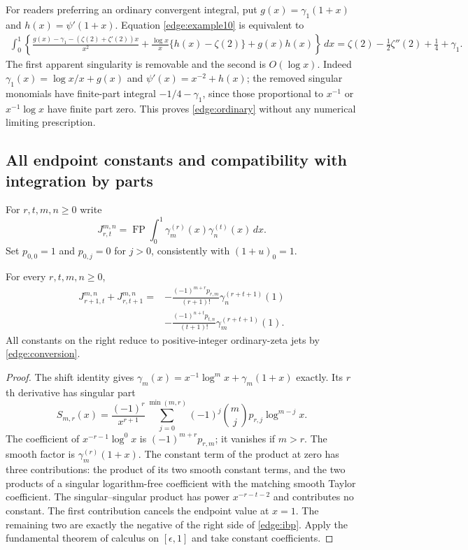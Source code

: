 For readers preferring an ordinary convergent integral, put
$g(x)=\gamma_1(1+x)$ and $h(x)=\psi'(1+x)$.
Equation \eqref{edge:example10} is equivalent to
\begin{equation}
 \begin{split}
 \int_0^1\left\{
   \frac{g(x)-\gamma_1-(\zeta(2)+\zeta'(2))x}{x^2}
  +\frac{\log x}{x}\{h(x)-\zeta(2)\}+g(x)h(x)
                  \right\}\,dx
 =\zeta(2)-\frac12\zeta''(2)+\frac14+\gamma_1.
 \end{split}
 \label{edge:ordinary}
\end{equation}
The first apparent singularity is removable and the second is
$O(\log x)$.  Indeed
$\gamma_1(x)=\log x/x+g(x)$ and $\psi'(x)=x^{-2}+h(x)$;
the removed singular monomials have finite-part integral
$-1/4-\gamma_1$, since those proportional to $x^{-1}$ or
$x^{-1}\log x$ have finite part zero.  This proves
\eqref{edge:ordinary} without any numerical limiting prescription.

\subsection{All endpoint constants and compatibility with integration by parts}

For $r,t,m,n\ge0$ write
\[
 J_{r,t}^{m,n}=\operatorname{FP}\int_0^1
                         \gamma_m^{(r)}(x)\gamma_n^{(t)}(x)\,dx.
\]
Set $p_{0,0}=1$ and $p_{0,j}=0$ for $j>0$, consistently with
$(1+u)_0=1$.

\begin{theorem}
\label{edge:endpoint}
For every $r,t,m,n\ge0$,
\begin{equation}
 \boxed{\begin{aligned}
 J_{r+1,t}^{m,n}+J_{r,t+1}^{m,n}
 ={}&-\frac{(-1)^{m+r}p_{r,m}}{(r+1)!}
                       \gamma_n^{(r+t+1)}(1)\\
    &-\frac{(-1)^{n+t}p_{t,n}}{(t+1)!}
                       \gamma_m^{(r+t+1)}(1).
 \end{aligned}}
 \label{edge:ibp}
\end{equation}
All constants on the right reduce to positive-integer ordinary-zeta
jets by \eqref{edge:conversion}.
\end{theorem}

\begin{proof}
The shift identity gives
$\gamma_m(x)=x^{-1}\log^m x+\gamma_m(1+x)$ exactly.
Its $r$th derivative has singular part
\[
 S_{m,r}(x)=\frac{(-1)^r}{x^{r+1}}
      \sum_{j=0}^{\min(m,r)}(-1)^j\binom mjp_{r,j}\log^{m-j}x.
\]
The coefficient of $x^{-r-1}\log^0x$ is
$(-1)^{m+r}p_{r,m}$; it vanishes if $m>r$.
The smooth factor is $\gamma_m^{(r)}(1+x)$.
The constant term of the product at zero has three contributions:
the product of its two smooth constant terms, and the two products
of a singular logarithm-free coefficient with the matching smooth
Taylor coefficient.  The singular--singular product has power
$x^{-r-t-2}$ and contributes no constant.
The first contribution cancels the endpoint value at $x=1$.
The remaining two are exactly the negative of the right side of
\eqref{edge:ibp}.  Apply the fundamental theorem of calculus on
$[\epsilon,1]$ and take constant coefficients.
\end{proof}

